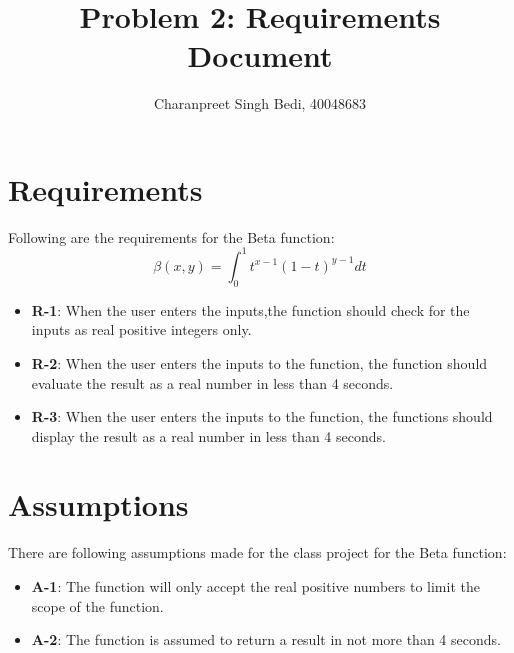 \documentclass[12pt]{article}
\title{Problem 2: Requirements Document}
\author{Charanpreet Singh Bedi, 40048683 }
\date{}
\begin{document}
\maketitle

\section{Requirements}
Following are the requirements for the Beta function:
$$\beta(x,y) =\int_{0}^{1} t^{x-1} (1-t)^{y-1} dt$$
\begin{itemize}
    \item \textbf{R-1}: When the user enters the inputs,the function should check for the inputs as real positive integers only.
    \item \textbf{R-2}: When the user enters the inputs to the function, the function should evaluate the result as a real number in less than 4 seconds.
    \item \textbf{R-3}: When the user enters the inputs to the function, the functions should display the result as a real number in less than 4 seconds.
\end{itemize}

\section{Assumptions}
There are following assumptions made for the class project for the Beta function:
\begin{itemize}
    \item \textbf{A-1}: The function will only accept the real positive numbers to limit the scope of the function.
    \item \textbf{A-2}: The function is assumed to return a result in not more than 4 seconds.
    
\end{itemize}
\end{document}
